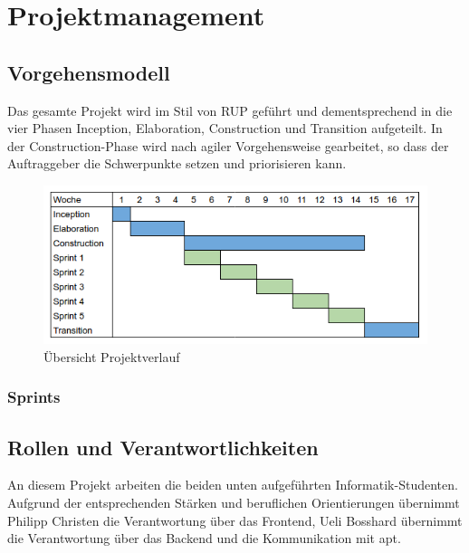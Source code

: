 
\chapter{Projektmanagement}

\section{Vorgehensmodell}

Das gesamte Projekt wird im Stil von RUP geführt und dementsprechend in die vier Phasen Inception, Elaboration, Construction und Transition aufgeteilt. In der Construction-Phase wird nach agiler Vorgehensweise gearbeitet, so dass der Auftraggeber die Schwerpunkte setzen und priorisieren kann.

\begin{figure}[H]
	\centering
	\includegraphics[width=0.8\linewidth]{fig/project_overview}
	\caption{Übersicht Projektverlauf}
	\label{fig:pm:project_overview}
\end{figure}

\subsection*{Sprints}

\section{Rollen und Verantwortlichkeiten}

An diesem Projekt arbeiten die beiden unten aufgeführten Informatik-Studenten. Aufgrund der entsprechenden Stärken und beruflichen Orientierungen übernimmt Philipp Christen die Verantwortung über das Frontend, Ueli Bosshard übernimmt die Verantwortung über das Backend und die Kommunikation mit apt.

